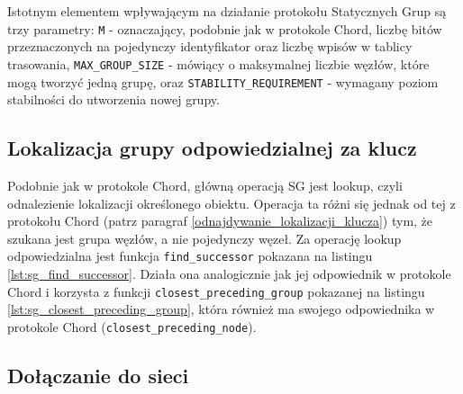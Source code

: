 \documentclass[12pt, twoside, openany]{report}
\begin{document}
Istotnym elementem wpływającym na działanie protokołu Statycznych Grup są trzy parametry: \texttt{M} - oznaczający, podobnie jak w protokole Chord, liczbę bitów przeznaczonych na pojedynczy identyfikator oraz liczbę wpisów w tablicy trasowania, \texttt{MAX\_GROUP\_SIZE} - mówiący o maksymalnej liczbie węzłów, które mogą tworzyć jedną grupę, oraz \texttt{STABILITY\_REQUIREMENT} - wymagany poziom stabilności do utworzenia nowej grupy.

\subsection{Lokalizacja grupy odpowiedzialnej za klucz}

Podobnie jak w protokole Chord, główną operacją SG jest lookup, czyli odnalezienie lokalizacji określonego obiektu. Operacja ta różni się jednak od tej z protokołu Chord (patrz paragraf \ref{odnajdywanie_lokalizacji_klucza}) tym, że szukana jest grupa węzłów, a nie pojedynczy węzeł. Za operację lookup odpowiedzialna jest funkcja \texttt{find\_successor} pokazana na listingu \ref{lst:sg_find_successor}. Działa ona analogicznie jak jej odpowiednik w protokole Chord i korzysta z funkcji \texttt{closest\_preceding\_group} pokazanej na listingu \ref{lst:sg_closest_preceding_group}, która również ma swojego odpowiednika w protokole Chord (\texttt{closest\_preceding\_node}).





\subsection{Dołączanie do sieci}
\end{document}
